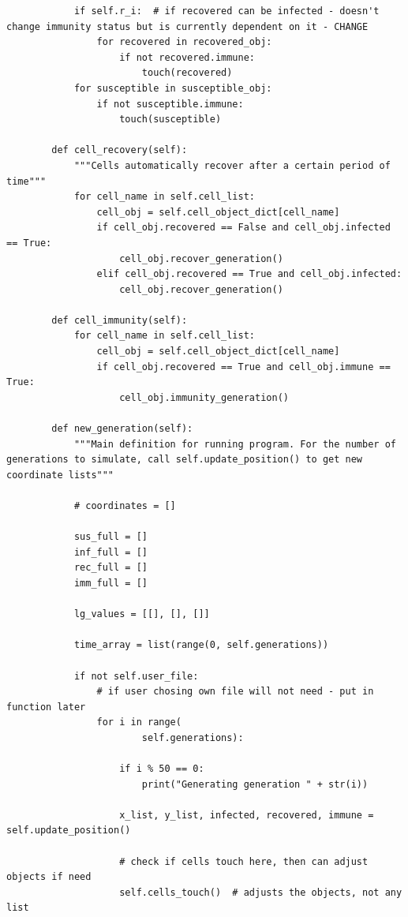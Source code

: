 \documentclass[11pt, a4paper]{article}
\begin{document}
\begin{lstlisting}
            if self.r_i:  # if recovered can be infected - doesn't change immunity status but is currently dependent on it - CHANGE
                for recovered in recovered_obj:
                    if not recovered.immune:
                        touch(recovered)
            for susceptible in susceptible_obj:
                if not susceptible.immune:
                    touch(susceptible)
    
        def cell_recovery(self):
            """Cells automatically recover after a certain period of time"""
            for cell_name in self.cell_list:
                cell_obj = self.cell_object_dict[cell_name]
                if cell_obj.recovered == False and cell_obj.infected == True:
                    cell_obj.recover_generation()
                elif cell_obj.recovered == True and cell_obj.infected:
                    cell_obj.recover_generation()
    
        def cell_immunity(self):
            for cell_name in self.cell_list:
                cell_obj = self.cell_object_dict[cell_name]
                if cell_obj.recovered == True and cell_obj.immune == True:
                    cell_obj.immunity_generation()
    
        def new_generation(self):
            """Main definition for running program. For the number of generations to simulate, call self.update_position() to get new coordinate lists"""
    
            # coordinates = []
    
            sus_full = []
            inf_full = []
            rec_full = []
            imm_full = []
    
            lg_values = [[], [], []]
    
            time_array = list(range(0, self.generations))
    
            if not self.user_file:
                # if user chosing own file will not need - put in function later
                for i in range(
                        self.generations):
    
                    if i % 50 == 0:
                        print("Generating generation " + str(i))
    
                    x_list, y_list, infected, recovered, immune = self.update_position()
    
                    # check if cells touch here, then can adjust objects if need
                    self.cells_touch()  # adjusts the objects, not any list
    

\end{lstlisting}
\end{document}
